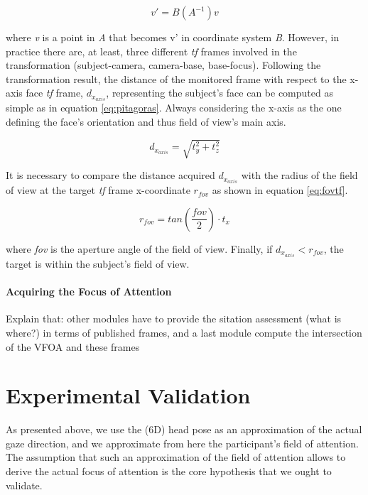 \documentclass{sig-alternate}
\begin{document}
\begin{equation}
v' = B(A^{-1})v
\label{eq:transform}
\end{equation}

where \textit{v} is a point in \textit{A} that becomes v' in coordinate system
\textit{B}. However, in practice there are, at least, three different
\textit{tf} frames involved in the transformation (subject-camera, camera-base,
base-focus). Following the transformation result, the distance of the monitored
frame with respect to the x-axis face \textit{tf} frame, $ d_{x_{axis}} $,
representing the subject's face can be computed as simple as in equation
\ref{eq:pitagoras}. Always considering the x-axis as the one defining the face's
orientation and thus field of view's main axis.

\begin{equation}
d_{x_{axis}} = \sqrt{t_y^2 + t_z^2}
\label{eq:pitagoras}
\end{equation}

It is necessary to compare the distance acquired $ d_{x_{axis}} $ with the
radius of the field of view at the target \textit{tf} frame x-coordinate $
r_{fov} $ as shown in equation \ref{eq:fovtf}.

\begin{equation}
r_{fov} = tan\left(\frac{fov}{2}\right) \cdot t_x
\label{eq:fovtf}
\end{equation}

where \textit{fov} is the aperture angle of the field of view. Finally, if $
d_{x_{axis}}<r_{fov} $, the target is within the subject's field of view.


\paragraph{Acquiring the Focus of Attention}

Explain that: other modules have to provide the sitation assessment (what
is where?) in terms of published frames, and a last module compute the
intersection of the VFOA and these frames

\section{Experimental Validation}

As presented above, we use the (6D) head pose as an approximation of the
actual gaze direction, and we approximate from here the participant's field of
attention. The assumption that such an approximation of the field of attention
allows to derive the actual focus of attention is the core hypothesis that we
ought to validate.
\end{document}
